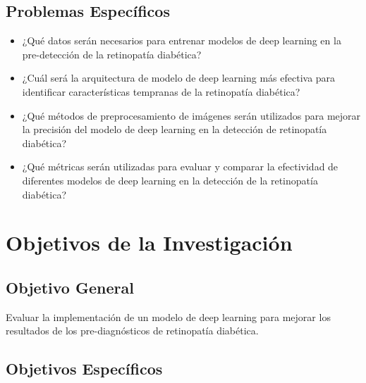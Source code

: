 \subsection{Problemas Específicos}
\newcommand{\Pbone}{
	¿Qué datos serán necesarios para entrenar modelos de deep learning en la pre-detección de la retinopatía diabética?
}
\newcommand{\Pbtwo}{
	¿Cuál será la arquitectura de modelo de deep learning más efectiva para identificar características tempranas de la retinopatía diabética?
}
\newcommand{\Pbthree}{
	¿Qué métodos de preprocesamiento de imágenes serán utilizados para mejorar la precisión del modelo de deep learning en la detección de retinopatía diabética?

}
\newcommand{\Pbfour}{
	¿Qué métricas serán utilizadas para evaluar y comparar la efectividad de diferentes modelos de deep learning en la detección de la retinopatía diabética?
}
\newcommand{\Pbfive}{
	ES
}

\begin{itemize}
	\item \Pbone
	\item \Pbtwo
	\item \Pbthree
	 \item \Pbfour
\end{itemize}

\section{Objetivos de la Investigación}

\subsection{Objetivo General}
\newcommand{\ObjetivoGeneral}{
	Evaluar la implementación de un modelo de deep learning para mejorar los resultados de los pre-diagnósticos de retinopatía diabética.
}
\ObjetivoGeneral

\subsection{Objetivos Específicos}
\newcommand{\Objone}{
	Identificar los datos necesarios para entrenar modelos de deep learning en la pre-detección de la retinopatía diabética.
}
\newcommand{\Objtwo}{
	Determinar la arquitectura de modelo de deep learning más efectiva para identificar características tempranas de la retinopatía diabética.
}
\newcommand{\Objthree}{
	Evaluar los métodos de preprocesamiento de imágenes que mejoren la precisión del modelo de deep learning en la detección de retinopatía diabética.
}
\newcommand{\Objfour}{
	Definir y utilizar métricas para evaluar y comparar la efectividad de diferentes modelos de deep learning en la detección de la retinopatía diabética.
}
\newcommand{\Objfive}{

}

